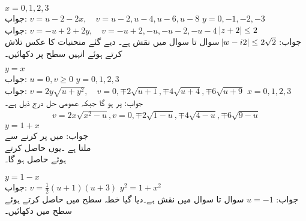\quad
$x=0,1,2,3$\\
جواب:\quad
$v=u-2-2x,\quad v=u-2,u-4,u-6,u-8 $
\quad
$y=0,-1,-2,-3$\\
جواب:\quad
$v=-u+2+2y,\quad v=-u+2,-u,-u-2,-u-4$
\quad
$\abs{z+2}\le 2$\\
جواب:\quad
$\abs{w-i2}\le 2\sqrt{2}$
سوال  تا سوال  میں نقش  ہے۔ دیے گئے منحنیات کا عکس تلاش کرتے ہوئے انہیں  سطح پر دکھائیں۔ 

\quad
$y=x$\\
جواب:\quad
$u=0, v\ge 0$
\quad
$y=0,1,2,3$\\
جواب:\quad
$v= 2y\sqrt{u+y^2},\quad v=0,\mp 2\sqrt{u+1}, \mp 4\sqrt{u+4},\mp 6\sqrt{u+9}$
\quad
$x=0,1,2,3$\\
جواب:\quad
{} پر  ہو گا جبکہ عمومی حل درج ذیل ہے۔\\
\begin{align*}
v= 2x\sqrt{x^2-u}, v=0,\mp 2\sqrt{1-u},\mp 4\sqrt{4-u},\mp 6\sqrt{9-u}
\end{align*}
\quad
$y=1+x$\\
جواب:\quad
{} میں  پر کرنے سے\\
  ملتا ہے ۔یوں  حاصل کرتے\\
 ہوئے  حاصل ہو گا۔

\quad
$y=1-x$\\
جواب:\quad
$v=\tfrac{1}{2}(u+1)(u+3)$
\quad
$y^2=1+x^2$\\
جواب:\quad
$u=-1$
سوال  تا سوال  میں نقش  ہے۔دیا گیا خطہ  سطح میں حاصل کرتے ہوئے  سطح میں  دکھائیں۔

